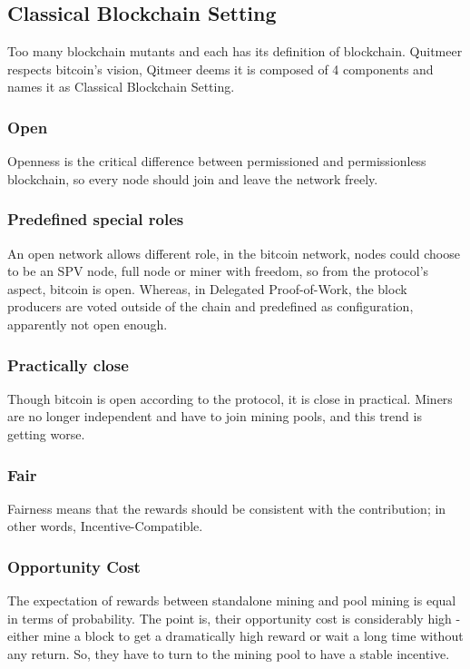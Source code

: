 \documentclass[a4paper,11pt]{article}
\begin{document}
\subsection{Classical Blockchain Setting}
Too many blockchain mutants and each has its definition of blockchain. Quitmeer respects bitcoin's vision, Qitmeer deems it is composed of 4 components and names it as Classical Blockchain Setting.

\subsubsection{Open}
Openness is the critical difference between permissioned and permissionless blockchain, so every node should join and leave the network freely. 

\subsubsection*{Predefined special roles}
An open network allows different role, in the bitcoin network, nodes could choose to be an SPV node, full node or miner with freedom, so from the protocol's aspect, bitcoin is open. Whereas, in Delegated Proof-of-Work, the block producers are voted outside of the chain and predefined as configuration, apparently not open enough.

\subsubsection*{Practically close}
Though bitcoin is open according to the protocol, it is close in practical. Miners are no longer independent and have to join mining pools, and this trend is getting worse. 


\subsubsection{Fair}
Fairness means that the rewards should be consistent with the contribution; in other words, Incentive-Compatible.

\subsubsection*{Opportunity Cost}
The expectation of rewards between standalone mining and pool mining is equal in terms of probability. The point is, their opportunity cost is considerably high - either mine a block to get a dramatically high reward or wait a long time without any return. So, they have to turn to the mining pool to have a stable incentive. 
\end{document}
